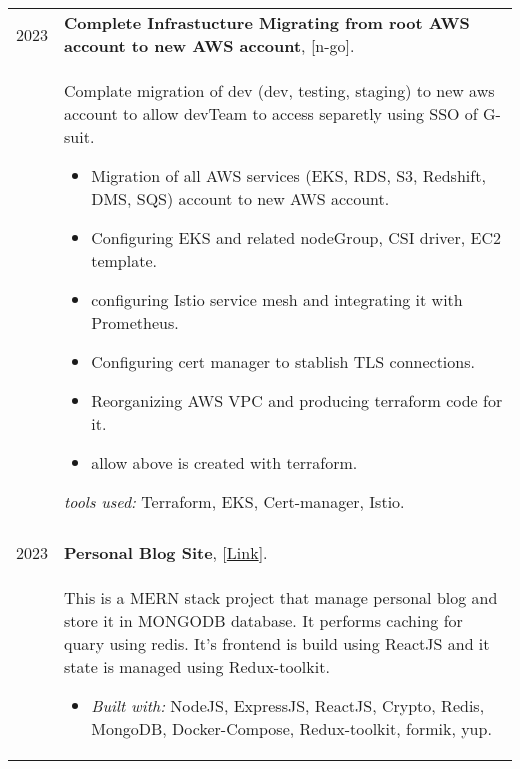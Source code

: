 \documentclass[a4paper,10pt]{article}
\begin{document}
\begin{longtable}{r p{16cm}}
        2023  & \textbf{Complete Infrastucture Migrating from root AWS account to new AWS account}, [n-go].\\&
        Complate migration of dev (dev, testing, staging) to new aws account to allow devTeam to access separetly using SSO of G-suit. 
        \begin{itemize}
            \item  Migration of all AWS services (EKS, RDS, S3, Redshift, DMS, SQS) account to new AWS account.
            \item Configuring EKS and related nodeGroup, CSI driver, EC2 template.
            \item configuring Istio service mesh and integrating it with Prometheus. 
            \item Configuring cert manager to stablish TLS connections.
            \item Reorganizing AWS VPC and producing terraform code for it. 
            \item allow above is created with terraform.
        \end{itemize}
        \textit{tools used: } Terraform, EKS, Cert-manager, Istio.\\
        &\\
        2023  & \textbf{Personal Blog Site}, [\href{https://github.com/zaky-fetoh/Personal-Blog-Site}{Link}].\\&
        This is a MERN stack project that manage personal blog and store it in MONGODB database. It performs caching for quary using redis. It's frontend is build using ReactJS and it state is managed using Redux-toolkit.
        \begin{itemize}
            \item \textit{Built with: } NodeJS, ExpressJS,  ReactJS, Crypto, Redis, MongoDB, Docker-Compose, Redux-toolkit, formik, yup.
        \end{itemize}\\
        

\end{longtable}
\end{document}
